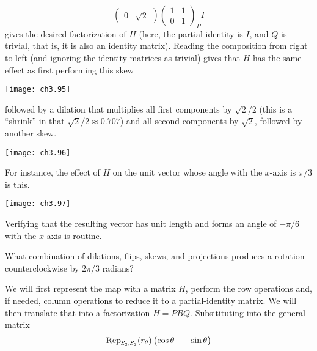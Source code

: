 \begin{exercises}
\begin{answer}
\begin{exparts}
\begin{equation*}
{\begin{pmatrix}
                0           &\sqrt{2}
              \end{pmatrix}
              \begin{pmatrix}
                1  &1 \\
                0  &1
              \end{pmatrix}
             }_P
            I
          \end{equation*}
          gives the desired factorization of $H$ (here, the partial
          identity is $I$, and $Q$ is trivial, that is, it is also an identity
          matrix).
        \partsitem Reading the composition from right to left (and ignoring the
          identity matrices as trivial) gives that $H$ has the same
          effect as first performing this skew 
          \begin{center}
            \texttt{[image: ch3.95]}
         \end{center}
         followed by a dilation that multiplies all first components by 
         $\sqrt{2}/2$ (this is a ``shrink'' in that $\sqrt{2}/2\approx0.707$) 
         and all second components by $\sqrt{2}$,
         followed by another skew. 
          \begin{center}
            \texttt{[image: ch3.96]}
         \end{center}
         For instance, the effect of $H$ on the unit vector whose angle with
         the $x$-axis is $\pi/3$ is this.
          \begin{center}
            \texttt{[image: ch3.97]}
         \end{center}
         Verifying that the resulting vector has unit length and forms an
         angle of $-\pi/6$ with the $x$-axis is routine. 
      \end{exparts}
    \end{answer}
  \item 
    What combination of dilations, flips, skews, and projections
    produces a rotation counterclockwise by $2\pi/3$ radians?
    \begin{answer}
      We will first represent the map with a matrix $H$,
      perform the row operations and, if needed, column operations
      to reduce it to a partial-identity matrix.
      We will then translate that into a factorization $H=PBQ$.
      Subsitituting into the general matrix
          \begin{equation*}
            \rep{r_\theta}{\stdbasis_2,\stdbasis_2}
            \begin{pmatrix}
              \cos\theta  &-\sin\theta  \\

\end{pmatrix}
\end{equation*}
\end{answer}
\end{exercises}
